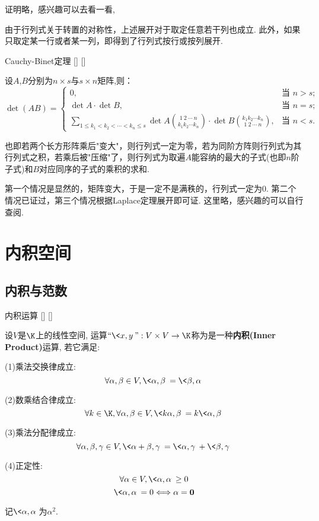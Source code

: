 \documentclass[UTF8]{ctexart}
\begin{document}
    \begin{prf}
        证明略，感兴趣可以去看一看, 
    \end{prf}
    由于行列式关于转置的对称性，上述展开对于取定任意若干列也成立. 此外，如果只取定某一行或者某一列，即得到了行列式按行或按列展开.
    \begin{thm}
			[]
			{Cauchy-Binet定理}
			[]
			[]

        设$A$,$B$分别为$n\times s$与$s\times n$矩阵,则：
        \[\det(AB)=\begin{cases}0,&\text{当 }n>s;\\
        \det A\cdot\det B,&\text{当 }n=s;\\
        \sum_{1\leqslant k_1<k_2<\cdots<k_n\leqslant s}\det A\binom{1\ 2\ \cdots \ n}{k_1k_2\cdots k_n}\cdot\det B\binom{k_1k_2\cdots k_n}{1\ 2\ \cdots \ n},&\text{当 }n<s.\end{cases}\]
    \end{thm}
    也即若两个长方形阵乘后"变大"，则行列式一定为零，若为同阶方阵则行列式为其行列式之积，若乘后被"压缩"了，则行列式为取遍$A$能容纳的最大的子式(也即$n$阶子式)和$B$对应同序的子式的乘积的求和.
    \begin{prf}
        第一个情况是显然的，矩阵变大，于是一定不是满秩的，行列式一定为0. 第二个情况已证过，第三个情况根据Laplace定理展开即可证. 这里略，感兴趣的可以自行查阅.
    \end{prf}

\section{内积空间}
	
	\subsection{内积与范数}
			
		\begin{dfn}
			[]
			{内积运算}
			[]
			[]

			设$V$是$\K$上的线性空间, 运算$``\<x,y\>":V\times V\to\K$称为是一种\textbf{内积(Inner Product)}运算, 若它满足: 
			
			(1)乘法交换律成立: 
			\[\forall\alpha,\beta\in V, \<\alpha,\beta\>=\<\beta,\alpha\>\]
			
			(2)数乘结合律成立: 
			\[\forall k\in\K, \forall \alpha,\beta\in V, \<k\alpha,\beta\>=k\<\alpha,\beta\>\]
			
			(3)乘法分配律成立: 
			\[\forall\alpha,\beta,\gamma\in V, \<\alpha+\beta,\gamma\>=\<\alpha,\gamma\>+\<\beta,\gamma\>\]
			
			(4)正定性: 
			\[\forall \alpha\in V, \<\alpha,\alpha\>\geq 0\]
			\[\<\alpha,\alpha\>=0\Longleftrightarrow \alpha=\mathbf{0}\]
			
			记$\<\alpha,\alpha\>$为$\alpha^2$. 
		\end{dfn}
		
\end{document}
